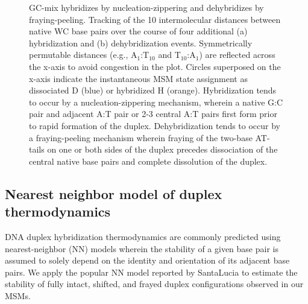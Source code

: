 \documentclass[journal=jpcbfk,manuscript=article]{achemso}
\begin{document}
\begin{figure}[ht!]
	\centering
    \caption{GC-mix hybridizes by nucleation-zippering and dehybridizes by fraying-peeling. Tracking of the 10 intermolecular distances between native WC base pairs over the course of four additional (a) hybridization and (b) dehybridization events. Symmetrically permutable distances (e.g., A$_1$:T$_{10}$ and T$_{10}$:A$_1$) are reflected across the x-axis to avoid congestion in the plot. Circles superposed on the x-axis indicate the instantaneous MSM state assignment as dissociated D (blue) or hybridized H (orange). Hybridization tends to occur by a nucleation-zippering mechanism, wherein a native G:C pair and adjacent A:T pair or 2-3 central A:T pairs first form prior to rapid formation of the duplex. Dehybridization tends to occur by a fraying-peeling mechanism wherein fraying of the two-base AT-tails on one or both sides of the duplex precedes dissociation of the central native base pairs and complete dissolution of the duplex.}
    \label{fig:SIFig5}
\end{figure}

\clearpage
\newpage

\subsection*{Nearest neighbor model of duplex thermodynamics}

DNA duplex hybridization thermodynamics are commonly predicted using nearest-neighbor (NN) models wherein the stability of a given base pair is assumed to solely depend on the identity and orientation of its adjacent base pairs. We apply the popular NN model reported by SantaLucia\citep{SantaLucia1998AThermodynamics} to estimate the stability of fully intact, shifted, and frayed duplex configurations observed in our MSMs. 
\end{document}

